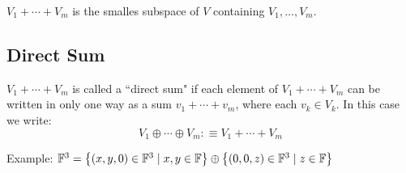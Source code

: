 \setcounter{thm}{39}
\begin{thm}
  $V_1 + \cdots + V_m$ is the smalles subspace of $V$ containing $V_1, \dots, V_m.$
\end{thm}

\subsection{Direct Sum}

\setcounter{thm}{40}
\begin{mydef}
  \label{def-of-direct-sum}
  $V_1 + \cdots + V_m$ is called a ``direct sum" if each element of $V_1 +\cdots+V_m$ can be written in only one way as a sum $v_1 + \cdots + v_m$, where each $v_k \in V_k$. In this case we write:
  \begin{equation}
    V_1 \oplus \cdots \oplus V_m :\equiv V_1 + \cdots + V_m
  \end{equation}
\end{mydef}

\begin{example}
  Example: $\mathbb{F}^3 =
  \left \{ \left ( x, y, 0 \right ) \in \mathbb{F}^3 \mid x,y \in \mathbb{F} \right \}
  \oplus
  \left \{ \left (  0, 0, z  \right ) \in \mathbb{F}^3 \mid z \in \mathbb{F} \right \}$
\end{example}


